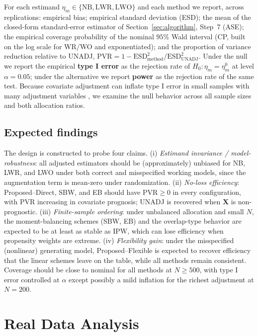 \documentclass[11pt,a4paper]{article}
\begin{document}
For each estimand $\eta_m\in\{\mathrm{NB},\mathrm{LWR},\mathrm{LWO}\}$ and each method we
report, across replications: empirical bias; empirical standard deviation (ESD); the mean
of the closed-form standard-error estimator of Section~\ref{sec:algorithm}, Step~7 (ASE);
the empirical coverage probability of the nominal $95\%$ Wald interval (CP, built on the
log scale for WR/WO and exponentiated); and the proportion of variance reduction relative
to UNADJ, $\mathrm{PVR}=1-\mathrm{ESD}^2_{\text{method}}/\mathrm{ESD}^2_{\text{UNADJ}}$.
Under the null we report the empirical \textbf{type I error} as the rejection rate of
$H_0\!:\eta_m=\eta_m^0$ at level $\alpha=0.05$; under the alternative we report
\textbf{power} as the rejection rate of the same test. Because covariate adjustment can
inflate type I error in small samples with many adjustment variables
\citep{scheidegger2026covariate}, we examine the null behavior across all sample sizes and
both allocation ratios.

\subsection{Expected findings}\label{sec:sim_expected}

The design is constructed to probe four claims. (i) \emph{Estimand invariance /
model-robustness}: all adjusted estimators should be (approximately) unbiased for NB, LWR,
and LWO under both correct and misspecified working models, since the augmentation term is
mean-zero under randomization. (ii) \emph{No-loss efficiency}: Proposed--Direct, SBW, and
EB should have $\mathrm{PVR}\ge 0$ in every configuration, with PVR increasing in covariate
prognosis; UNADJ is recovered when $\mathbf X$ is non-prognostic. (iii) \emph{Finite-sample
ordering}: under unbalanced allocation and small $N$, the moment-balancing schemes
(SBW, EB) and the overlap-type behavior are expected to be at least as stable as IPW,
which can lose efficiency when propensity weights are extreme. (iv) \emph{Flexibility
gain}: under the misspecified (nonlinear) generating model, Proposed--Flexible is expected
to recover efficiency that the linear schemes leave on the table, while all methods remain
consistent. Coverage should be close to nominal for all methods at $N\ge 500$, with type I
error controlled at $\alpha$ except possibly a mild inflation for the richest adjustment at
$N=200$.


\section{Real Data Analysis}
\end{document}
